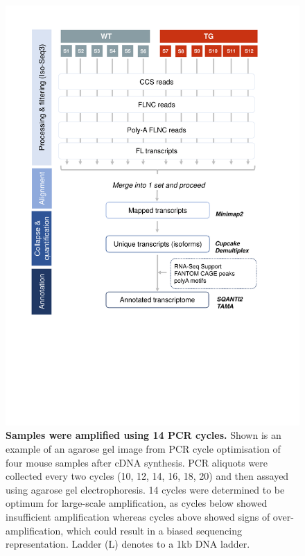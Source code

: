 \vspace{1cm}
\begin{figure}[!htp]
	\centering
	\includegraphics[page=2,trim={2.5cm 25cm 0cm 0cm},clip,scale = 1]{Figures/WholeTranscriptome_Figures.pdf}
	\captionsetup{width=0.95\textwidth}
	\caption[Iso-Seq global transcriptome profiling - PCR cycle optimisation]%
	{\textbf{Samples were amplified using 14 PCR cycles.} Shown is an example of an agarose gel image from PCR cycle optimisation of four mouse samples after cDNA synthesis. PCR aliquots were collected every two cycles (10, 12, 14, 16, 18, 20) and then assayed using agarose gel electrophoresis. 14 cycles were determined to be optimum for large-scale amplification, as cycles below showed insufficient amplification whereas cycles above showed signs of over-amplification, which could result in a biased sequencing representation. Ladder (L) denotes to a 1kb DNA ladder.}
	\label{fig:isoseq_whole_pccresults}
\end{figure}

